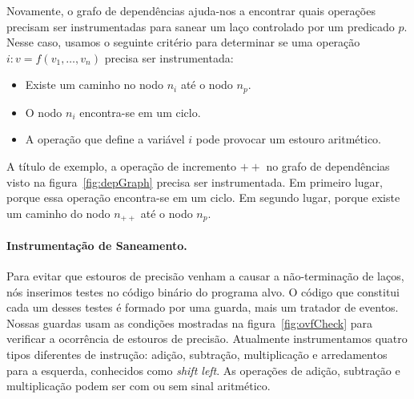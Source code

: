 \documentclass{llncs}
\begin{document}
Novamente, o grafo de dependências ajuda-nos a encontrar quais operações
precisam ser instrumentadas para sanear um laço controlado por um
predicado $p$.
Nesse caso, usamos o seguinte critério para determinar se uma operação
$i : v = f(v_1, \ldots, v_n)$ precisa ser instrumentada:
%
\begin{itemize}
\item Existe um caminho no nodo $n_i$ até o nodo $n_p$.
\item O nodo $n_i$ encontra-se em um ciclo.
\item A operação que define a variável $i$ pode provocar um estouro aritmético.
\end{itemize}
%
A título de exemplo, a operação de incremento $++$ no grafo de dependências
visto na figura~\ref{fig:depGraph} precisa ser instrumentada.
Em primeiro lugar, porque essa operação encontra-se em um ciclo.
Em segundo lugar, porque existe um caminho do nodo $n_{++}$ até o nodo
$n_p$.

\paragraph{Instrumentação de Saneamento. }
Para evitar que estouros de precisão venham a causar a não-terminação
de laços, nós inserimos testes no código binário do programa alvo.
O código que constitui cada um desses testes é formado por uma guarda, mais
um tratador de eventos.
Nossas guardas usam as condições mostradas na figura~\ref{fig:ovfCheck} para
verificar a ocorrência de estouros de precisão.
Atualmente instrumentamos quatro tipos diferentes de instrução:
adição, subtração, multiplicação e arredamentos para a esquerda, conhecidos como {\em shift left}.
As operações de adição, subtração e multiplicação podem ser com ou sem sinal
aritmético.
\end{document}
